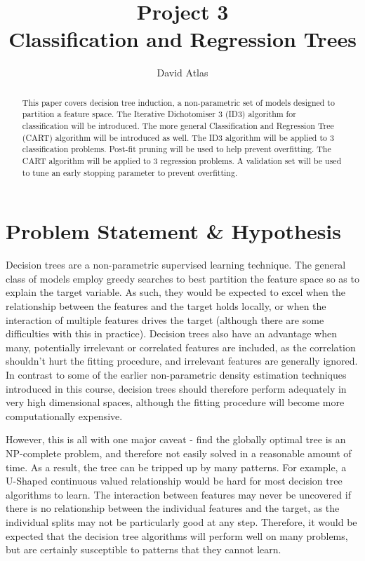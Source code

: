 \documentclass{amsart}
\title{Project 3 \\ Classification and Regression Trees}
\author{David Atlas}
\begin{document}
    \maketitle
    \begin{abstract}
    This paper covers decision tree induction, a non-parametric
    set of models designed to partition a feature space. The Iterative Dichotomiser 3 (ID3)
    algorithm for classification will be introduced. The more general
    Classification and Regression Tree (CART) algorithm will be introduced as well.
    The ID3 algorithm will be applied to 3 classification problems.
    Post-fit pruning will be used to help prevent overfitting.
    The CART algorithm will be applied to 3 regression problems.
    A validation set will be used to tune an early stopping parameter to
    prevent overfitting.
    \end{abstract}

    \section{Problem Statement \& Hypothesis}
    Decision trees are a non-parametric supervised learning technique.
    The general class of models employ greedy searches to best partition
    the feature space so as to explain the target variable. As such, they would
    be expected to excel when the relationship between the features and the target
    holds locally, or when the interaction of multiple features drives the target (although
    there are some difficulties with this in practice). Decision trees also have an advantage
    when many, potentially irrelevant or correlated features are included, as
    the correlation shouldn't hurt the fitting procedure, and irrelevant features are
    generally ignored. In contrast to some of the earlier non-parametric
    density estimation techniques introduced in this course, decision trees should therefore
    perform adequately in very high dimensional spaces, although the fitting procedure will
    become more computationally expensive.

    However, this is all with one major caveat - find the globally optimal tree is an NP-complete problem,
    and therefore not easily solved in a reasonable amount of time. As a result, the tree can be tripped up by many
    patterns. For example, a U-Shaped continuous valued relationship would be hard for most decision tree algorithms to learn.
    The interaction between features may never be uncovered if there is no relationship between the individual features and the
    target, as the individual splits may not be particularly good at any step.
    Therefore, it would be expected that the decision tree algorithms will perform well on many problems, but are certainly
    susceptible to patterns that they cannot learn.
\end{document}
